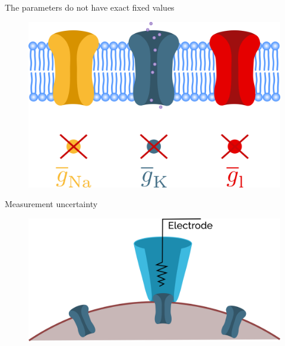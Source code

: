 \documentclass[presentation]{beamer}
\begin{document}
\begin{frame}{The parameters do not have exact fixed values}
  \begin{figure}
    \includegraphics[width=1\textwidth]{not_deterministic_channels.png}
  \end{figure}

\end{frame}







\begin{frame}{Measurement uncertainty}

  \begin{figure}
    \includegraphics[width=1\textwidth]{patch_clamp.png}
  \end{figure}

\end{frame}
\end{document}

